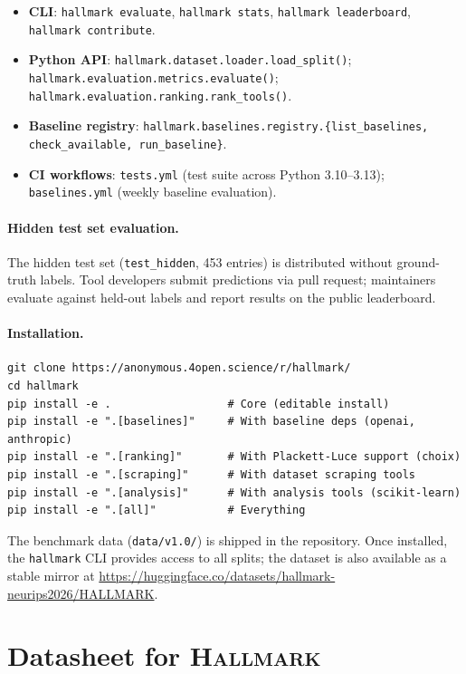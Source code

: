 \begin{itemize}
    \item \textbf{CLI}: \texttt{hallmark evaluate}, \texttt{hallmark stats}, \texttt{hallmark leaderboard}, \texttt{hallmark contribute}.
    \item \textbf{Python API}: \texttt{hallmark.dataset.loader.load\_split()};
          \texttt{hallmark.evaluation.metrics.\allowbreak{}evaluate()};
          \texttt{hallmark.evaluation.ranking.\allowbreak{}rank\_tools()}.
    \item \textbf{Baseline registry}: \texttt{hallmark.baselines.registry.\allowbreak{}\{list\_baselines,\allowbreak{} check\_available,\allowbreak{} run\_baseline\}}.
    \item \textbf{CI workflows}: \texttt{tests.yml} (test suite across Python 3.10--3.13); \texttt{baselines.yml} (weekly baseline evaluation).
\end{itemize}

\paragraph{Hidden test set evaluation.}
The hidden test set (\texttt{test\_hidden}, 453 entries) is distributed without ground-truth labels.
Tool developers submit predictions via pull request; maintainers evaluate against held-out labels and report results on the public leaderboard.

\paragraph{Installation.}
\begin{verbatim}
git clone https://anonymous.4open.science/r/hallmark/
cd hallmark
pip install -e .                  # Core (editable install)
pip install -e ".[baselines]"     # With baseline deps (openai, anthropic)
pip install -e ".[ranking]"       # With Plackett-Luce support (choix)
pip install -e ".[scraping]"      # With dataset scraping tools
pip install -e ".[analysis]"      # With analysis tools (scikit-learn)
pip install -e ".[all]"           # Everything
\end{verbatim}

\noindent The benchmark data (\texttt{data/v1.0/}) is shipped in the repository. Once installed, the \texttt{hallmark} CLI provides access to all splits; the dataset is also available as a stable mirror at \url{https://huggingface.co/datasets/hallmark-neurips2026/HALLMARK}.

\section{Datasheet for \textsc{Hallmark}}
\label{app:datasheet}

